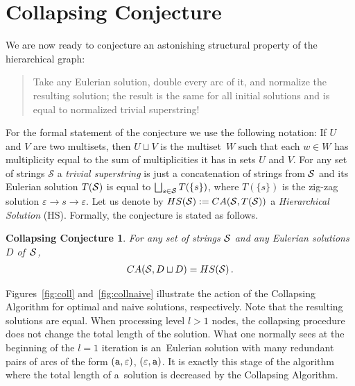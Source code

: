 \section{Collapsing Conjecture}
\label{sec:collapsing}

We are now ready to conjecture an astonishing structural property of the hierarchical graph: 
\begin{quote}
Take any Eulerian solution, double every arc of it, and normalize the resulting solution; the result is the same for all initial solutions and is equal to normalized trivial superstring!
\end{quote}
For the formal statement of the conjecture we use the following notation:  If $U$ and $V$ are two multisets, then $U\sqcup V$ is the multiset~$W$ such that each $w\in W$ has multiplicity equal to the sum of multiplicities it has in sets $U$ and $V$. For any set of strings $\mathcal{S}$ a {\em trivial superstring} is just a concatenation of strings from ${\cal S}$ and its Eulerian solution $T({\cal S})$ is equal to $\bigsqcup_{s\in{\cal S}} T(\{ s \})$, where $T(\{ s \})$ is the zig-zag solution $\varepsilon \to s \to \varepsilon$. Let us denote by $HS({\cal S}) := CA({\cal S}, T({\cal S}))$ a {\em Hierarchical Solution} (HS).
Formally, the conjecture is stated as follows.
\newtheorem*{scs}{Collapsing Conjecture}
\begin{scs}
For any set of strings ${\cal S}$ and any Eulerian solutions~$D$ of~${\cal S}$, 
\begin{align*}
CA({\cal S}, D \sqcup D) =  HS({\cal S}) \, .
\end{align*}
\end{scs}

Figures~\ref{fig:coll} and~\ref{fig:collnaive} illustrate the action of
the Collapsing Algorithm for optimal and naive solutions, respectively. Note that the resulting solutions are equal. When processing level $l>1$ nodes, 
the collapsing procedure does not change the total length of the solution. What one normally sees at the beginning of the
$l=1$ iteration is an~Eulerian solution with many 
redundant pairs of arcs of the form $({\tt a}, \varepsilon)$, $(\varepsilon, {\tt a})$. It is exactly this stage of the algorithm where the total length of a~solution is decreased by the Collapsing Algorithm. 

